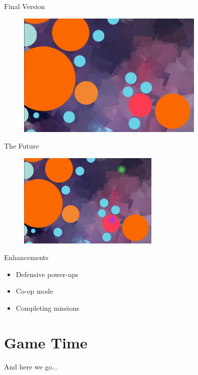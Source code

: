 \documentclass[]{beamer}
\begin{document}
\begin{frame}{Final Version}
  \begin{figure}
    \includegraphics[width=0.8\textwidth]{img/final.png}
  \end{figure}
\end{frame}

\begin{frame}{The Future}
  \begin{figure}
    \includegraphics[width=0.6\textwidth]{img/future.png}
  \end{figure}
  \begin{block}{Enhancements}
    \begin{itemize}
    \item Defensive power-ups
    \item Co-op mode
    \item Completing missions
    \end{itemize}
  \end{block}
\end{frame}



\section{Game Time}
\begin{frame}{}
  And here we go...
\end{frame}
\end{document}
